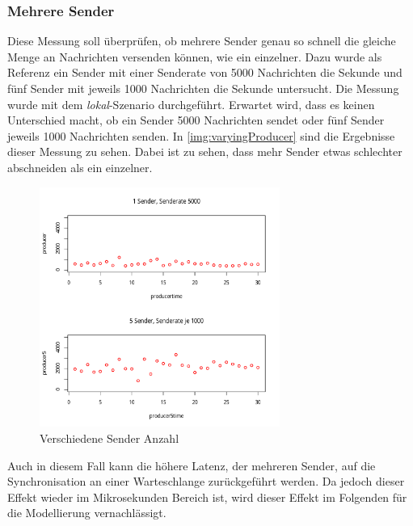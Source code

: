 \subsubsection{Mehrere Sender}
Diese Messung soll überprüfen, ob mehrere Sender genau so schnell die gleiche Menge an Nachrichten versenden können, wie ein einzelner. Dazu wurde als Referenz ein Sender mit einer Senderate von 5000 Nachrichten die Sekunde und fünf Sender mit jeweils 1000 Nachrichten die Sekunde untersucht. Die Messung wurde mit dem \textit{lokal}-Szenario durchgeführt. Erwartet wird, dass es keinen Unterschied macht, ob ein Sender 5000 Nachrichten sendet oder fünf Sender jeweils 1000 Nachrichten senden. 
In \autoref{img:varyingProducer} sind die Ergebnisse dieser Messung zu sehen. Dabei ist zu sehen, dass mehr Sender etwas schlechter abschneiden als ein einzelner. 
\begin{figure}
\center
  \includegraphics[width=0.7\textwidth]{images/measurement/varying-producer.pdf}
  \caption{Verschiedene Sender Anzahl}
  \label{img:varyingProducer}
\end{figure}
Auch in diesem Fall kann die höhere Latenz, der mehreren Sender, auf die Synchronisation an einer Warteschlange zurückgeführt werden. Da jedoch dieser Effekt wieder im Mikrosekunden Bereich ist, wird dieser Effekt im Folgenden für die Modellierung vernachlässigt. 
